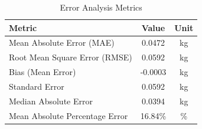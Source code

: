 
\begin{table}[h]
\centering
\caption{Error Analysis Metrics}
\label{tab:errors}
\begin{tabular}{lcc}
\hline
\textbf{Metric} & \textbf{Value} & \textbf{Unit} \\
\hline
Mean Absolute Error (MAE) & 0.0472 & kg \\
Root Mean Square Error (RMSE) & 0.0592 & kg \\
Bias (Mean Error) & -0.0003 & kg \\
Standard Error & 0.0592 & kg \\
Median Absolute Error & 0.0394 & kg \\
Mean Absolute Percentage Error & 16.84\% & \% \\
\hline
\end{tabular}
\end{table}

